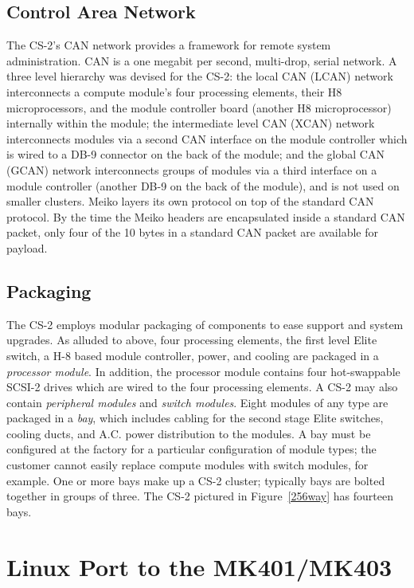 \documentclass{article}
\begin{document}
\subsection{Control Area Network}\label{canintro}

  The CS-2's CAN network\cite{Meiko95c} provides a framework for remote 
system administration.
CAN is a one megabit per second, multi-drop, serial network.  A three level 
hierarchy was devised for the CS-2:  the local CAN (LCAN) network interconnects
a compute module's four processing elements, their H8 microprocessors, and the
module controller board (another H8 microprocessor) internally within the 
module;  
the intermediate level CAN (XCAN) network interconnects modules via
a second CAN interface on the module controller which is wired to a DB-9
connector on the back of the module;  
and the global CAN (GCAN) network interconnects groups of modules via a third
interface on a module controller (another DB-9 on the back of the module), 
and is not used on smaller clusters.   Meiko layers its own protocol on top
of the standard CAN protocol.  By the time the Meiko headers are encapsulated
inside a standard CAN packet, only four of the 10 bytes in a standard CAN
packet are available for payload.

\subsection{Packaging}

The CS-2 employs modular packaging of components to ease support and system
upgrades.  As alluded to above, four 
processing elements, the first level Elite switch, a H-8 based module 
controller, power, and cooling are packaged in a 
{\em processor module}.
In addition, the processor module contains four hot-swappable SCSI-2 drives
which are wired to the four processing elements.  A CS-2 may also contain
{\em peripheral modules} and {\em switch modules}.
Eight modules of any type 
are packaged in a {\em bay}\cite{Meiko95b}, which includes cabling 
for the second stage Elite 
switches, cooling ducts, and A.C. power distribution to the modules.
A bay must be configured at the factory for a particular configuration of
module types;  the customer cannot easily replace compute modules with
switch modules, for example.
One or more bays make up a CS-2 cluster; typically bays are bolted 
together in groups of three.   The CS-2 pictured in Figure~\ref{256way}
has fourteen bays.

\section{Linux Port to the MK401/MK403}\label{mk403}
\end{document}
